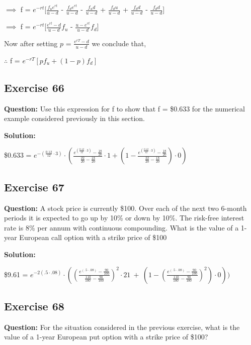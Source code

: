 \documentclass{article}
\begin{document}
$\implies$ f = $e^{-rt}$[$\frac{f_{u}e^{rt}}{u-d}$ - $\frac{f_{d}e^{rt}}{u-d}$ - $\frac{f_{u}d}{u-d}$ + $\frac{f_{d}u}{u-d}$ + $\frac{f_{d}d}{u-d}$ - $\frac{f_{d}d}{u-d}$]

\vspace{\baselineskip}

$\implies$ f = $e^{-rt}$[$\frac{e^{rt} - d}{u-d}$$f_u$ - $\frac{u - e^{rt}}{u-d}$$f_d$]

\vspace{\baselineskip}

Now after setting $p$ = $\frac{e^{rT}-d}{u-d}$ we conclude that,

\vspace{\baselineskip}

$\therefore$ f = $e^{-rT}\left[pf_u+(1-p)f_d\right]$

\subsection*{Exercise 66}
\textbf{Question:} Use this expression for f to show that f = \$0.633 for the numerical example considered previously in this section.

\textbf{Solution:}

\$0.633 = $e^{-\left(\frac{0.12}{12}\cdot3\right)} \cdot \left(\frac{e^{\left(\frac{0.12}{12}\cdot3\right)} - \frac{18}{20}}{\frac{22}{20} - \frac{18}{20}} \cdot 1 + \left(1 - \frac{e^{\left(\frac{0.12}{12}\cdot3\right)} - \frac{18}{20}}{\frac{22}{20} - \frac{18}{20}}\right) \cdot 0\right)$

\subsection*{Exercise 67}
\textbf{Question:} A stock price is currently \$100. Over each of the next two 6-month periods it is expected to go up
by 10\% or down by 10\%. The risk-free interest rate is 8\% per annum with continuous compounding. What is the
value of a 1-year European call option with a strike price of \$100

\textbf{Solution:}

\$9.61 = $e^{-2\left(.5\cdot.08\right)}\cdot\left(\left(\frac{e^{\left(.5\cdot.08\right)}-\frac{90}{100}}{\frac{110}{100\ }-\frac{90}{100}}\right)^{2}\cdot21\ +\ \left(1-\left(\frac{e^{\left(.5\cdot.08\right)}-\frac{90}{100}}{\frac{110}{100\ }-\frac{90}{100}}\right)^{2}\right)\cdot0\right))$


\subsection*{Exercise 68}
\textbf{Question:} For the situation considered in the previous exercise, what is the value of a 1-year European put option with a strike price of \$100?
\end{document}
